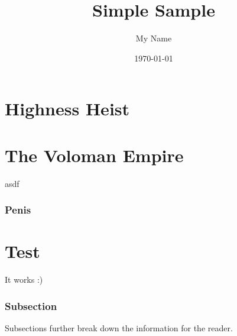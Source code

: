 \documentclass[letterpaper,twocolumn,openany]{memoir}
\title{Simple Sample} %
\author{My Name} %
\date{\today} %
\begin{document}

\tableofcontents

\chapter{Highness Heist}

\lipsum


\chapter{The Voloman Empire}

asdf

\subsection{Penis}
\lipsum

\chapter{Test}
It works :)

\subsection{Subsection}
Subsections further break down the information for the reader.






\end{document}
